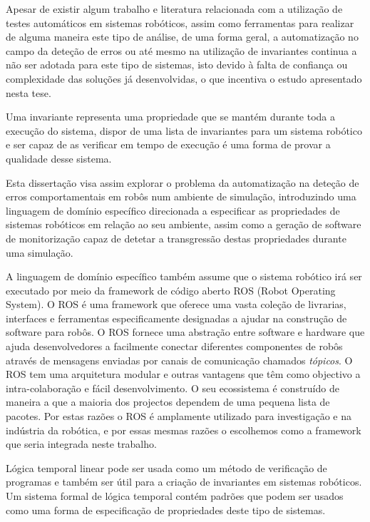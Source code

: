 Apesar de existir algum trabalho e literatura relacionada com a utilização de testes automáticos em sistemas robóticos, assim como ferramentas para realizar de alguma maneira este tipo de análise, de uma forma geral, a automatização no campo da deteção de erros ou até mesmo na utilização de invariantes continua a não ser adotada para este tipo de sistemas, isto devido à falta de confiança ou complexidade das soluções já desenvolvidas, o que incentiva o estudo apresentado nesta tese.

Uma invariante representa uma propriedade que se mantém durante toda a execução do sistema, dispor de uma lista de invariantes para um sistema robótico e ser capaz de as verificar em tempo de execução é uma forma de provar a qualidade desse sistema.

Esta dissertação visa assim explorar o problema da automatização na deteção de erros comportamentais em robôs num ambiente de simulação, introduzindo uma linguagem de domínio específico direcionada a especificar as propriedades de sistemas robóticos em relação ao seu ambiente, assim como a geração de software de monitorização capaz de detetar a transgressão destas propriedades durante uma simulação.

A linguagem de domínio específico também assume que o sistema robótico irá ser executado por meio da framework de código aberto ROS (Robot Operating System). O ROS é uma framework que oferece uma vasta coleção de livrarias, interfaces e ferramentas especificamente designadas a ajudar na construção de software para robôs. O ROS fornece uma abstração entre software e hardware que ajuda desenvolvedores a facilmente conectar diferentes componentes de robôs através de mensagens enviadas por canais de comunicação chamados \textit{tópicos}. O ROS tem uma arquitetura modular e outras vantagens que têm como objectivo a intra-colaboração e fácil desenvolvimento. O seu ecossistema é construído de maneira a que a maioria dos projectos dependem de uma pequena lista de pacotes. Por estas razões o ROS é amplamente utilizado para investigação e na indústria da robótica, e por essas mesmas razões o escolhemos como a framework que seria integrada neste trabalho.

Lógica temporal linear pode ser usada como um método de verificação de programas e também ser útil para a criação de invariantes em sistemas robóticos. Um sistema formal de lógica temporal contém padrões que podem ser usados como uma forma de especificação de propriedades deste tipo de sistemas.

